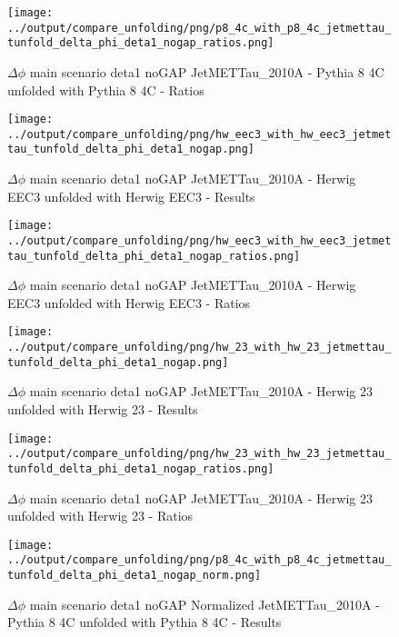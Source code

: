 \documentclass[11pt]{book}
\begin{document}
\begin{figure}[ht]
\centering
\texttt{[image: ../output/compare\_unfolding/png/p8\_4c\_with\_p8\_4c\_jetmettau\_tunfold\_delta\_phi\_deta1\_nogap\_ratios.png]}
\caption{$\Delta\phi$ main scenario deta1 noGAP JetMETTau\_2010A - Pythia 8 4C unfolded with Pythia 8 4C - Ratios}
\label{p8_p8_jetmettau_tunfold_delta_phi_deta1_nogap_b}
\end{figure}

\begin{figure}[ht]
\centering
\texttt{[image: ../output/compare\_unfolding/png/hw\_eec3\_with\_hw\_eec3\_jetmettau\_tunfold\_delta\_phi\_deta1\_nogap.png]}
\caption{$\Delta\phi$ main scenario deta1 noGAP JetMETTau\_2010A - Herwig EEC3 unfolded with Herwig EEC3 - Results}
\label{hw_eec3_hw_eec3_jetmettau_tunfold_delta_phi_deta1_nogap_a}
\end{figure}

\begin{figure}[ht]
\centering
\texttt{[image: ../output/compare\_unfolding/png/hw\_eec3\_with\_hw\_eec3\_jetmettau\_tunfold\_delta\_phi\_deta1\_nogap\_ratios.png]}
\caption{$\Delta\phi$ main scenario deta1 noGAP JetMETTau\_2010A - Herwig EEC3 unfolded with Herwig EEC3 - Ratios}
\label{hw_eec3_hw_eec3_jetmettau_tunfold_delta_phi_deta1_nogap_b}
\end{figure}

\begin{figure}[ht]
\centering
\texttt{[image: ../output/compare\_unfolding/png/hw\_23\_with\_hw\_23\_jetmettau\_tunfold\_delta\_phi\_deta1\_nogap.png]}
\caption{$\Delta\phi$ main scenario deta1 noGAP JetMETTau\_2010A - Herwig 23 unfolded with Herwig 23 - Results}
\label{hw_23_hw_23_jetmettau_tunfold_delta_phi_deta1_nogap_a}
\end{figure}

\begin{figure}[ht]
\centering
\texttt{[image: ../output/compare\_unfolding/png/hw\_23\_with\_hw\_23\_jetmettau\_tunfold\_delta\_phi\_deta1\_nogap\_ratios.png]}
\caption{$\Delta\phi$ main scenario deta1 noGAP JetMETTau\_2010A - Herwig 23 unfolded with Herwig 23 - Ratios}
\label{hw_23_hw_23_jetmettau_tunfold_delta_phi_deta1_nogap_b}
\end{figure}


\begin{figure}[ht]
\centering
\texttt{[image: ../output/compare\_unfolding/png/p8\_4c\_with\_p8\_4c\_jetmettau\_tunfold\_delta\_phi\_deta1\_nogap\_norm.png]}
\caption{$\Delta\phi$ main scenario deta1 noGAP Normalized JetMETTau\_2010A - Pythia 8 4C unfolded with Pythia 8 4C - Results}
\label{p8_p8_jetmettau_tunfold_delta_phi_deta1_nogap_norm_a}
\end{figure}
\end{document}
